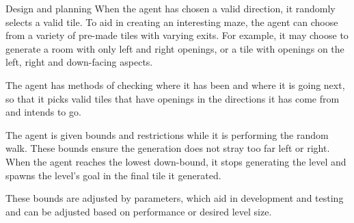 \documentclass[progress]{cmpreport}
\begin{document}
\begin{section}{Design and planning}
When the agent has chosen a valid direction, it randomly selects a valid tile. To aid in creating an interesting maze, the agent can choose from a variety of pre-made tiles with varying exits. For example, it may choose to generate a room with only left and right openings, or a tile with openings on the left, right and down-facing aspects. 

The agent has methods of checking where it has been and where it is going next, so that it picks valid tiles that have openings in the directions it has come from and intends to go.

The agent is given bounds and restrictions while it is performing the random walk. These bounds ensure the generation does not stray too far left or right. When the agent reaches the lowest down-bound, it stops generating the level and spawns the level's goal in the final tile it generated.

These bounds are adjusted by parameters, which aid in development and testing and can be adjusted based on performance or desired level size.

\end{section}
\end{document}
